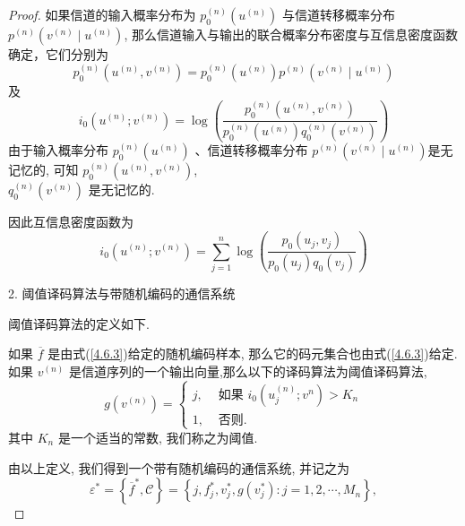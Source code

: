 \begin{proof}
如果信道的输入概率分布为 $ p_{0}^{(n)}\left(u^{(n)}\right) $ 与信道转移概率分布 $ p^{(n)}\left(v^{(n)} \mid u^{(n)}\right) $, 那么信道输入与输出的联合概率分布密度与互信息密度函数确定，它们分别为
$$
p_{0}^{(n)}\left(u^{(n)}, v^{(n)}\right)=p_{0}^{(n)}\left(u^{(n)}\right) p^{(n)}\left(v^{(n)} \mid u^{(n)}\right)
$$
及
$$
i_{0}\left(u^{(n)} ; v^{(n)}\right)=\log \left(\frac{p_{0}^{(n)}\left(u^{(n)}, v^{(n)}\right)}{p_{0}^{(n)}\left(u^{(n)}\right) q_{0}^{(n)}\left(v^{(n)}\right)}\right)
$$
由于输入概率分布 $ p_{0}^{(n)}\left(u^{(n)}\right) $ 、信道转移概率分布 $ p^{(n)}\left(v^{(n)} \mid u^{(n)}\right) $是无记忆的, 可知 $ p_{0}^{(n)}\left(u^{(n)}, v^{(n)}\right) $, \\$q_{0}^{(n)}\left(v^{(n)}\right) $ 是无记忆的.

因此互信息密度函数为
\begin{equation}\label{4.6.4}
i_{0}\left(u^{(n)} ; v^{(n)}\right)=\sum_{j=1}^{n} \log \left(\frac{p_{0}\left(u_{j}, v_{j}\right)}{p_{0}\left(u_{j}\right) q_{0}\left(v_{j}\right)}\right)
\end{equation}

2. 阈值译码算法与带随机编码的通信系统

阈值译码算法的定义如下.
\begin{definition}
    如果 $ \overline{f} $ 是由式(\ref{4.6.3})给定的随机编码样本, 那么它的码元集合也由式(\ref{4.6.3})给定. 如果 $ v^{(n)} $ 是信道序列的一个输出向量,那么以下的译码算法为阈值译码算法,
\begin{equation}\label{4.6.5}
    g\left(v^{(n)}\right)=\left\{\begin{array}{ll}
j, & \text { 如果 } i_{0}\left(u_{j}^{(n)} ; v^{n}\right)>K_{n} \\
1, & \text { 否则. }
\end{array}\right.
\end{equation}
其中 $ K_{n} $ 是一个适当的常数, 我们称之为阈值.
\end{definition}


由以上定义, 我们得到一个带有随机编码的通信系统, 并记之为
\begin{equation}\label{4.6.6}
\varepsilon^{*}=\left\{\overline{f}^{*}, \mathscr{C}\right\}=\left\{j, f_{j}^{*}, v_{j}^{*}, g\left(v_{j}^{*}\right): j=1,2, \cdots, M_{n}\right\},
\end{equation}


\end{proof}
